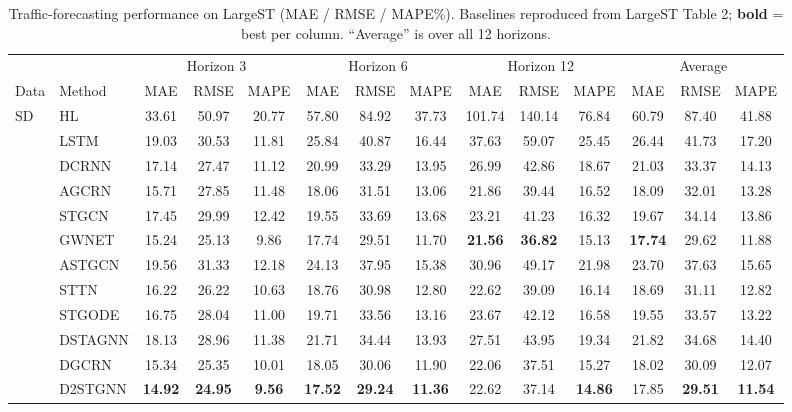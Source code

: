 \begin{table}[t]\centering\footnotesize\setlength{\tabcolsep}{3pt}
\caption{Traffic-forecasting performance on LargeST (MAE / RMSE / MAPE\%). Baselines reproduced from LargeST Table 2; \textbf{bold} = best per column. ``Average'' is over all 12 horizons.}
\label{tab:forecast_results}
\begin{tabular}{llcccccccccccc}
\toprule
& & \multicolumn{3}{c}{Horizon 3} & \multicolumn{3}{c}{Horizon 6} & \multicolumn{3}{c}{Horizon 12} & \multicolumn{3}{c}{Average} \\
\cmidrule(lr){3-5}\cmidrule(lr){6-8}\cmidrule(lr){9-11}\cmidrule(lr){12-14}
Data & Method & MAE & RMSE & MAPE & MAE & RMSE & MAPE & MAE & RMSE & MAPE & MAE & RMSE & MAPE \\
\midrule
\multirow{12}{*}{SD} & HL & 33.61 & 50.97 & 20.77 & 57.80 & 84.92 & 37.73 & 101.74 & 140.14 & 76.84 & 60.79 & 87.40 & 41.88 \\
 & LSTM & 19.03 & 30.53 & 11.81 & 25.84 & 40.87 & 16.44 & 37.63 & 59.07 & 25.45 & 26.44 & 41.73 & 17.20 \\
 & DCRNN & 17.14 & 27.47 & 11.12 & 20.99 & 33.29 & 13.95 & 26.99 & 42.86 & 18.67 & 21.03 & 33.37 & 14.13 \\
 & AGCRN & 15.71 & 27.85 & 11.48 & 18.06 & 31.51 & 13.06 & 21.86 & 39.44 & 16.52 & 18.09 & 32.01 & 13.28 \\
 & STGCN & 17.45 & 29.99 & 12.42 & 19.55 & 33.69 & 13.68 & 23.21 & 41.23 & 16.32 & 19.67 & 34.14 & 13.86 \\
 & GWNET & 15.24 & 25.13 & 9.86 & 17.74 & 29.51 & 11.70 & \textbf{21.56} & \textbf{36.82} & 15.13 & \textbf{17.74} & 29.62 & 11.88 \\
 & ASTGCN & 19.56 & 31.33 & 12.18 & 24.13 & 37.95 & 15.38 & 30.96 & 49.17 & 21.98 & 23.70 & 37.63 & 15.65 \\
 & STTN & 16.22 & 26.22 & 10.63 & 18.76 & 30.98 & 12.80 & 22.62 & 39.09 & 16.14 & 18.69 & 31.11 & 12.82 \\
 & STGODE & 16.75 & 28.04 & 11.00 & 19.71 & 33.56 & 13.16 & 23.67 & 42.12 & 16.58 & 19.55 & 33.57 & 13.22 \\
 & DSTAGNN & 18.13 & 28.96 & 11.38 & 21.71 & 34.44 & 13.93 & 27.51 & 43.95 & 19.34 & 21.82 & 34.68 & 14.40 \\
 & DGCRN & 15.34 & 25.35 & 10.01 & 18.05 & 30.06 & 11.90 & 22.06 & 37.51 & 15.27 & 18.02 & 30.09 & 12.07 \\
 & D2STGNN & \textbf{14.92} & \textbf{24.95} & \textbf{9.56} & \textbf{17.52} & \textbf{29.24} & \textbf{11.36} & 22.62 & 37.14 & \textbf{14.86} & 17.85 & \textbf{29.51} & \textbf{11.54} \\
\bottomrule\end{tabular}\end{table}
